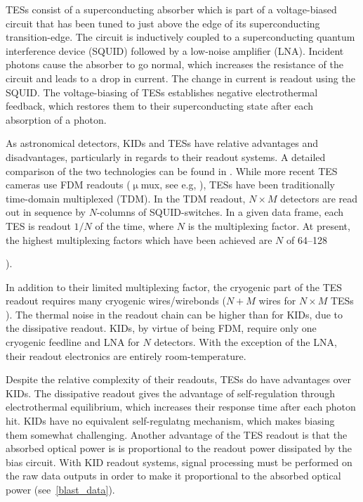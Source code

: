 TESs consist of a superconducting absorber which is part of a voltage-biased circuit that has been tuned to just above the edge of its superconducting transition-edge. The circuit is inductively coupled to a superconducting quantum interference device (SQUID) followed by a low-noise amplifier (LNA). Incident photons cause the absorber to go normal, which increases the resistance of the circuit and leads to a drop in current. The change in current is readout using the SQUID. The voltage-biasing of TESs establishes negative electrothermal feedback, which restores them to their superconducting state after each absorption of a photon.

As astronomical detectors, KIDs and TESs have relative advantages and disadvantages, particularly in regards to their readout systems. A detailed comparison of the two technologies can be found in \citet{mauskopf2018transition}. While more recent TES cameras use FDM readouts ($\upmu$mux, see e.g, \citet{stanchfield2016development}), TESs have been traditionally time-domain multiplexed (TDM). In the TDM readout, $N \times M$ detectors are read out in sequence by $N$-columns of SQUID-switches. In a given data frame, each TES is readout $1/N$ of the time, where $N$ is the multiplexing factor. At present, the highest multiplexing factors which have been achieved are $N$ of 64--128 {\citet{henderson2016advanced,mates2017simultaneous}).

In addition to their limited multiplexing factor, the cryogenic part of the TES readout requires many cryogenic wires/wirebonds ($N + M$ wires for $N \times M$ TESs \citep{mauskopf2018transition}). The thermal noise in the readout chain can be higher than for KIDs, due to the dissipative readout. KIDs, by virtue of being FDM, require only one cryogenic feedline and LNA for $N$ detectors. With the exception of the LNA, their readout electronics are entirely room-temperature.

Despite the relative complexity of their readouts, TESs do have advantages over KIDs. The dissipative readout gives the advantage of self-regulation through electrothermal equilibrium, which increases their response time after each photon hit. KIDs have no equivalent self-regulatng mechanism, which makes biasing them somewhat challenging. Another advantage of the TES readout is that the absorbed optical power is is proportional to the readout power dissipated by the bias circuit. With KID readout systems, signal processing must be performed on the raw data outputs in order to make it proportional to the absorbed optical power (see~\ref{blast_data}).

}

